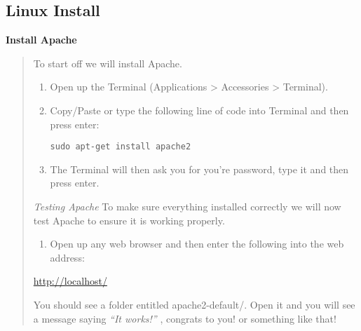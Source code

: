 \documentclass[letterpaper,10pt,english]{sphinxmanual}
\begin{document}
\subsection{Linux Install}
\label{prerequisites:linux-install}
\textbf{Install Apache}
\begin{quote}

To start off we will install Apache.
\begin{enumerate}
\item {} 
Open up the Terminal (Applications \textgreater{} Accessories \textgreater{} Terminal).

\item {} 
Copy/Paste or type the following line of code into Terminal and then press enter:

\begin{Verbatim}[commandchars=\\\{\}]
sudo apt-get install apache2
\end{Verbatim}

\item {} 
The Terminal will then ask you for you're password, type it and then press enter.

\end{enumerate}

\emph{Testing Apache}
To make sure everything installed correctly we will now test Apache to ensure it is working properly.
\begin{enumerate}
\item {} 
Open up any web browser and then enter the following into the web address:

\end{enumerate}

\href{http://localhost/}{http://localhost/}

You should see a folder entitled apache2-default/. Open it and you will see a message saying \emph{``It works!''} , congrats to you! or something like that!
\end{quote}
\end{document}
